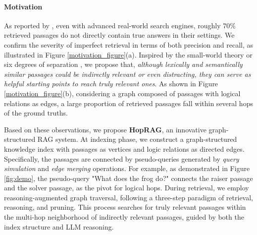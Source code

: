 \paragraph{Motivation} As reported by \citep{wang2024astute}, even with advanced real-world search engines, roughly 70\% retrieved passages do not directly contain true answers in their settings. We confirm the severity of imperfect retrieval in terms of both precision and recall, as illustrated in Figure \ref{motivation_figure}(a). Inspired by the small-world theory \citep{kleinberg2000small} or six degrees of separation \citep{guare2016six}, we propose that, \textit{although lexically and semantically similar passages could be indirectly relevant or even distracting, they can serve as helpful starting points to reach truly relevant ones}. As shown in Figure \ref{motivation_figure}(b), considering a graph composed of passages with logical relations as edges, a large proportion of retrieved passages fall within several hops of the ground truths. 

Based on these observations, we propose \textbf{HopRAG}, an innovative graph-structured RAG system. At indexing phase, we construct a graph-structured knowledge index with passages as vertices and logic relations as directed edges. Specifically, the passages are connected by pseudo-queries generated by \textit{query simulation} and \textit{edge merging} operations. For example, as demonstrated in Figure \ref{fig:demo}, the pseudo-query "What does the frog do?" connects the raiser passage and the solver passage, as the pivot for logical hops. During retrieval, we employ reasoning-augmented graph traversal, following a three-step paradigm of retrieval, reasoning, and pruning. This process searches for truly relevant passages within the multi-hop neighborhood of indirectly relevant passages, guided by both the index structure and LLM reasoning.

